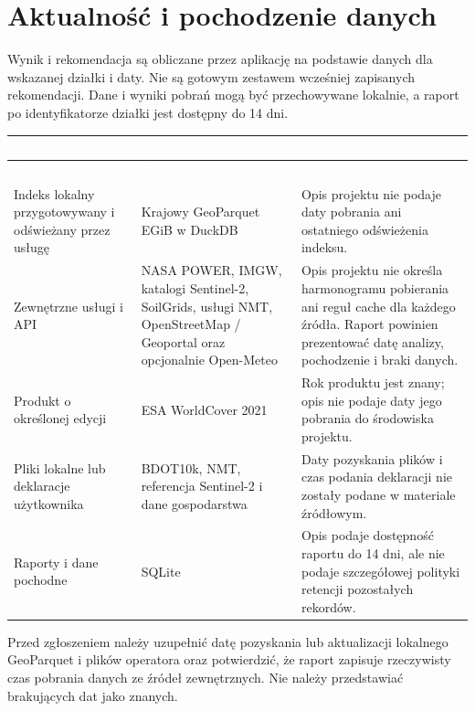 \documentclass[11pt,a4paper]{article}
\begin{document}
\section{Aktualność i pochodzenie danych}

Wynik i rekomendacja są obliczane przez aplikację na podstawie danych dla wskazanej działki i daty. Nie są gotowym zestawem wcześniej zapisanych rekomendacji. Dane i wyniki pobrań mogą być przechowywane lokalnie, a raport po identyfikatorze działki jest dostępny do 14 dni.

\begin{longtable}{@{}p{}p{}p{}@{}}
\toprule
\rowcolor{PWForest}\textcolor{white}{\textbf{Tryb}} & \textcolor{white}{\textbf{Dane}} & \textcolor{white}{\textbf{Informacja o dacie}} \\
\midrule
\endfirsthead
\toprule
\rowcolor{PWForest}\textcolor{white}{\textbf{Tryb}} & \textcolor{white}{\textbf{Dane}} & \textcolor{white}{\textbf{Informacja o dacie}} \\
\midrule
\endhead
Indeks lokalny przygotowywany i odświeżany przez usługę & Krajowy GeoParquet EGiB w DuckDB & Opis projektu nie podaje daty pobrania ani ostatniego odświeżenia indeksu. \\
Zewnętrzne usługi i API & NASA POWER, IMGW, katalogi Sentinel-2, SoilGrids, usługi NMT, OpenStreetMap / Geoportal oraz opcjonalnie Open-Meteo & Opis projektu nie określa harmonogramu pobierania ani reguł cache dla każdego źródła. Raport powinien prezentować datę analizy, pochodzenie i braki danych. \\
Produkt o określonej edycji & ESA WorldCover 2021 & Rok produktu jest znany; opis nie podaje daty jego pobrania do środowiska projektu. \\
Pliki lokalne lub deklaracje użytkownika & BDOT10k, NMT, referencja Sentinel-2 i dane gospodarstwa & Daty pozyskania plików i czas podania deklaracji nie zostały podane w materiale źródłowym. \\
Raporty i dane pochodne & SQLite & Opis podaje dostępność raportu do 14 dni, ale nie podaje szczegółowej polityki retencji pozostałych rekordów. \\
\bottomrule
\end{longtable}

Przed zgłoszeniem należy uzupełnić datę pozyskania lub aktualizacji lokalnego GeoParquet i plików operatora oraz potwierdzić, że raport zapisuje rzeczywisty czas pobrania danych ze źródeł zewnętrznych. Nie należy przedstawiać brakujących dat jako znanych.
\end{document}
